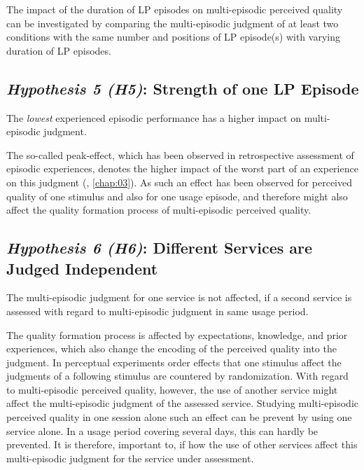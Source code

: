 The impact of the duration of \ac{LP} episodes on multi-episodic perceived quality can be investigated by comparing the multi-episodic judgment of at least two conditions with the same number and positions of \ac{LP} episode(s) with varying duration of \ac{LP} episodes.


\subsection*{\emph{Hypothesis 5 (H5)}: Strength of one \ac{LP} Episode}
\begin{hypothesis}[H5]\label{hypo:strength}
The \emph{lowest} experienced episodic performance has a higher impact on multi-episodic judgment.
\end{hypothesis}

The so-called peak-effect, which has been observed in retrospective assessment of episodic experiences, denotes the higher impact of the worst part of an experience on this judgment (\cf, \autoref{chap:03}).
As such an effect has been observed for perceived quality of one stimulus and also for one usage episode, and therefore might also affect the quality formation process of multi-episodic perceived quality.

\subsection*{\emph{Hypothesis 6 (H6)}: Different Services are Judged Independent}
\begin{hypothesis}[H6]\label{hypo:services}
The multi-episodic judgment for one service is not affected, if a second service is assessed with regard to multi-episodic judgment in same usage period.
\end{hypothesis}

The quality formation process is affected by expectations, knowledge, and prior experiences, which also change the encoding of the perceived quality into the judgment.
In perceptual experiments order effects that one stimulus affect the judgments of a following stimulus are countered by randomization.
With regard to multi-episodic perceived quality, however, the use of another service might affect the multi-episodic judgment of the assessed service.
Studying multi-episodic perceived quality in one session alone such an effect can be prevent by using one service alone.
In a usage period covering several days, this can hardly be prevented.
It is therefore, important to, if how the use of other services affect this multi-episodic judgment for the service under assessment.

